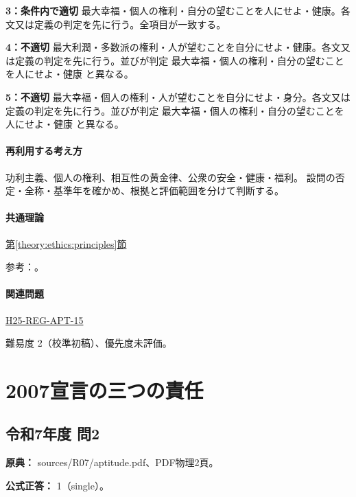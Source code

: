 \noindent\textbf{3：条件内で適切} 最大幸福・個人の権利・自分の望むことを人にせよ・健康。各文又は定義の判定を先に行う。全項目が一致する。\par

\noindent\textbf{4：不適切} 最大利潤・多数派の権利・人が望むことを自分にせよ・健康。各文又は定義の判定を先に行う。並びが判定 最大幸福・個人の権利・自分の望むことを人にせよ・健康 と異なる。\par

\noindent\textbf{5：不適切} 最大幸福・個人の権利・人が望むことを自分にせよ・身分。各文又は定義の判定を先に行う。並びが判定 最大幸福・個人の権利・自分の望むことを人にせよ・健康 と異なる。\par

\paragraph{再利用する考え方} 功利主義、個人の権利、相互性の黄金律、公衆の安全・健康・福利。 設問の否定・全称・基準年を確かめ、根拠と評価範囲を分けて判断する。

\paragraph{共通理論} \hyperref[theory:ethics:principles]{第\ref*{theory:ethics:principles}節}

\par 参考：\cite{scu_ethics_framework,ipej_ethics2011}。

\paragraph{関連問題} \hyperref[q:h25-reg-apt-15]{H25-REG-APT-15}

\par 難易度 2（校準初稿）、優先度未評価。

\section{2007宣言の三つの責任}

\subsection{令和7年度 問2}
\label{q:r07-reg-apt-02}

\noindent\textbf{原典：} sources/R07/aptitude.pdf、PDF物理2頁。

\textbf{公式正答：} 1（single）。

